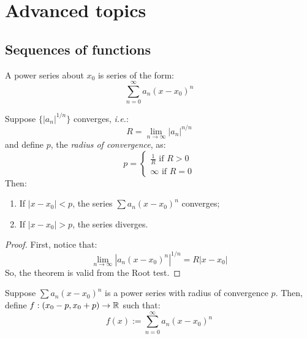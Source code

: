 \chapter{Advanced topics}

\section{Sequences of functions}

\begin{definition}
    A power series about $x_0$ is series of the form:
    \begin{equation*}
        \sum \limits_{n = 0}^\infty a_n(x - x_0)^n
    \end{equation*}
\end{definition}

\begin{theorem}
    Suppose $\{|a_n|^{1/n}\}$ converges, \emph{i.e.}:
    \begin{equation*}
        R = \lim \limits_{n \to \infty} |a_n|^{n/n}
    \end{equation*}
    and define $p$, the \emph{radius of convergence}, as:
    \begin{equation*}
        p = \begin{cases}
            \frac{1}{R} \text{ if } R > 0 \\
            \infty \text{ if } R = 0
        \end{cases}
    \end{equation*}
    Then:
    \begin{enumerate}
        \item If $|x-x_0| < p$, the series $\sum a_n(x - x_0)^n$ converges;
        \item If $|x-x_0| > p$, the series diverges.
    \end{enumerate}
\end{theorem}

\begin{proof}
    First, notice that:
    \begin{equation*}
        \lim \limits_{n \to \infty} |a_n(x-x_0)^n|^{1/n} = R |x-x_0|
    \end{equation*}
    So, the theorem is valid from the Root test.
\end{proof}

Suppose $\sum a_n(x-x_0)^n$ is a power series with radius of convergence $p$. Then, define $f: (x_0 - p, x_0 + p) \to \mathbb{R}$ such that:
\begin{equation*}
    f(x) := \sum \limits_{n=0}^\infty a_n (x - x_0)^n
\end{equation*}

